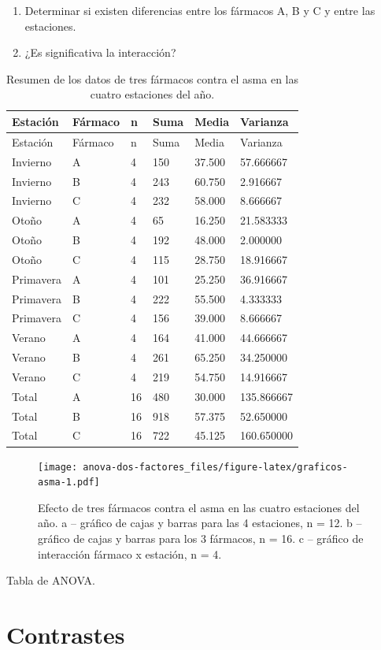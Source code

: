 \documentclass[]{book}
\theoremstyle{definition}
\theoremstyle{definition}
\theoremstyle{definition}
\theoremstyle{remark}
\begin{document}
\begin{enumerate}
\def\labelenumi{\alph{enumi})}
\item
  Determinar si existen diferencias entre los fármacos A, B y C y entre
  las estaciones.
\item
  ¿Es significativa la interacción?
\end{enumerate}

\begin{longtable}[]{@{}llllll@{}}
\caption{\label{tab:resumen-asma} Resumen de los datos de tres fármacos
contra el asma en las cuatro estaciones del año.}\tabularnewline
\toprule
Estación & Fármaco & n & Suma & Media & Varianza\tabularnewline
\midrule
\endfirsthead
\toprule
Estación & Fármaco & n & Suma & Media & Varianza\tabularnewline
\midrule
\endhead
Invierno & A & 4 & 150 & 37.500 & 57.666667\tabularnewline
Invierno & B & 4 & 243 & 60.750 & 2.916667\tabularnewline
Invierno & C & 4 & 232 & 58.000 & 8.666667\tabularnewline
Otoño & A & 4 & 65 & 16.250 & 21.583333\tabularnewline
Otoño & B & 4 & 192 & 48.000 & 2.000000\tabularnewline
Otoño & C & 4 & 115 & 28.750 & 18.916667\tabularnewline
Primavera & A & 4 & 101 & 25.250 & 36.916667\tabularnewline
Primavera & B & 4 & 222 & 55.500 & 4.333333\tabularnewline
Primavera & C & 4 & 156 & 39.000 & 8.666667\tabularnewline
Verano & A & 4 & 164 & 41.000 & 44.666667\tabularnewline
Verano & B & 4 & 261 & 65.250 & 34.250000\tabularnewline
Verano & C & 4 & 219 & 54.750 & 14.916667\tabularnewline
Total & A & 16 & 480 & 30.000 & 135.866667\tabularnewline
Total & B & 16 & 918 & 57.375 & 52.650000\tabularnewline
Total & C & 16 & 722 & 45.125 & 160.650000\tabularnewline
\bottomrule
\end{longtable}






\begin{figure}
\centering
\texttt{[image: anova-dos-factores\_files/figure-latex/graficos-asma-1.pdf]}
\caption{\label{fig:graficos-asma}Efecto de tres fármacos contra el asma en las cuatro
estaciones del año. a -- gráfico de cajas y barras para las 4
estaciones, n = 12. b -- gráfico de cajas y barras para los 3 fármacos,
n = 16. c -- gráfico de interacción fármaco x estación, n = 4.}
\end{figure}

\label{tab:anova-asma} Tabla de ANOVA.

\hypertarget{contrastes-1}{%
\section{Contrastes}\label{contrastes-1}}
\end{document}
